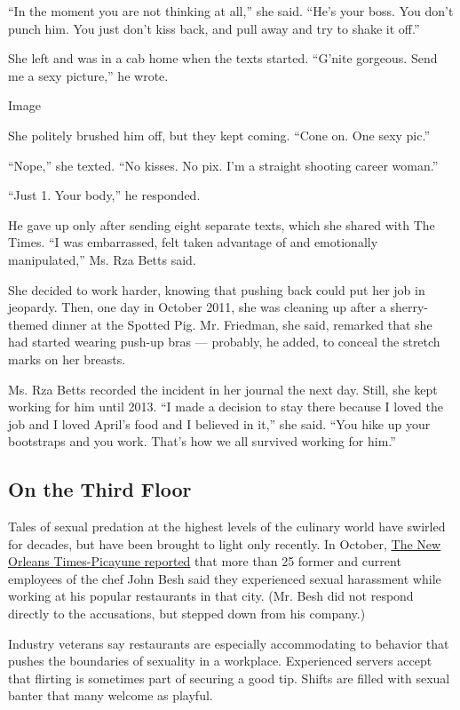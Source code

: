 ``In the moment you are not thinking at all,'' she said. ``He's your
boss. You don't punch him. You just don't kiss back, and pull away and
try to shake it off.''

She left and was in a cab home when the texts started. ``G'nite
gorgeous. Send me a sexy picture,'' he wrote.

Image

She politely brushed him off, but they kept coming. ``Cone on. One sexy
pic.''

``Nope,'' she texted. ``No kisses. No pix. I'm a straight shooting
career woman.''

``Just 1. Your body,'' he responded.

He gave up only after sending eight separate texts, which she shared
with The Times. ``I was embarrassed, felt taken advantage of and
emotionally manipulated,'' Ms. Rza Betts said.

She decided to work harder, knowing that pushing back could put her job
in jeopardy. Then, one day in October 2011, she was cleaning up after a
sherry-themed dinner at the Spotted Pig. Mr. Friedman, she said,
remarked that she had started wearing push-up bras --- probably, he
added, to conceal the stretch marks on her breasts.

Ms. Rza Betts recorded the incident in her journal the next day. Still,
she kept working for him until 2013. ``I made a decision to stay there
because I loved the job and I loved April's food and I believed in it,''
she said. ``You hike up your bootstraps and you work. That's how we all
survived working for him.''

\hypertarget{on-the-third-floor}{%
\subsection{On the Third Floor}\label{on-the-third-floor}}

Tales of sexual predation at the highest levels of the culinary world
have swirled for decades, but have been brought to light only recently.
In October,
\href{http://www.nola.com/business/index.ssf/2017/10/john_besh_restaurants_fostered.html}{The
New Orleans Times-Picayune reported} that more than 25 former and
current employees of the chef John Besh said they experienced sexual
harassment while working at his popular restaurants in that city. (Mr.
Besh did not respond directly to the accusations, but stepped down from
his company.)

Industry veterans say restaurants are especially accommodating to
behavior that pushes the boundaries of sexuality in a workplace.
Experienced servers accept that flirting is sometimes part of securing a
good tip. Shifts are filled with sexual banter that many welcome as
playful.

